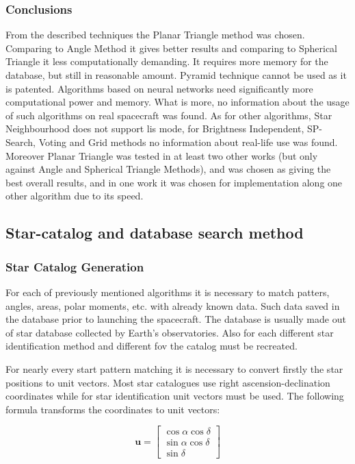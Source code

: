 \documentclass[12pt,a4paper,twoside]{article}
\begin{document}
\subsubsection{Conclusions}

From the described techniques the Planar Triangle method was chosen. Comparing to Angle Method it gives better results and comparing to Spherical Triangle it less computationally demanding\cite{tappe2009development}\cite{alidoost2013review}. It requires more memory for the database, but still in reasonable amount. Pyramid technique cannot be used as it is patented.
Algorithms based on neural networks need significantly more computational power and memory. What is more, no information about the usage of such algorithms on real spacecraft was found.
As for other algorithms, Star Neighbourhood does not support \gls{lis} mode, for Brightness Independent, SP-Search, Voting and Grid methods no information about real-life use was found. Moreover Planar Triangle was tested in at least two other works (but only against Angle and Spherical Triangle Methods), and was chosen as giving the best overall results, and in one work it was chosen for implementation along one other algorithm\cite{huffman2006designing} due to its speed.

\subsection{Star-catalog and database search method}

\subsubsection{Star Catalog Generation}

For each of previously mentioned algorithms it is necessary to match patters, angles, areas, polar moments, etc. with already known data. Such data saved in the database prior to launching the spacecraft. The database is usually made out of star database collected by Earth's observatories. Also for each different star identification method and different \gls{fov} the catalog must be recreated.
 
For nearly every start pattern matching it is necessary to convert firstly the star positions to unit vectors. Most star catalogues use right ascension-declination coordinates while for star identification unit vectors must be used\cite{mcbryde2012star}. The following formula transforms the coordinates to unit vectors:

\begin{equation}
\bm{u} = \begin{bmatrix}
\cos \alpha \cos \delta \\
\sin \alpha \cos \delta \\
\sin \delta
\end{bmatrix}
\end{equation}
\end{document}
